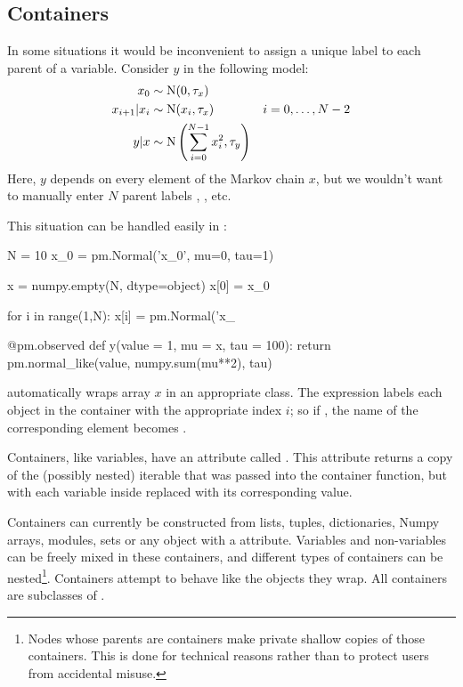 \documentclass[]{jss}
\begin{document}
\subsection{Containers} \label{container}

In some situations it would be inconvenient to assign a unique label to each parent of a variable. Consider $y$ in the following model:
\begin{align*}
    x_0 &\sim \textup N (0,\tau_x)\\
    x_{i+1}|x_i &\sim \textup{N}(x_i, \tau_x)
    &i=0,\ldots, N-2\\
    y|x &\sim \textup N \left(\sum_{i=0}^{N-1}x_i^2,\tau_y\right)
\end{align*}
Here, $y$ depends on every element of the Markov chain $x$, but we wouldn't want to manually enter $N$ parent labels , , etc.

This situation can be handled easily in :
\begin{CodeInput}
N = 10
x_0 = pm.Normal('x_0', mu=0, tau=1)

x = numpy.empty(N, dtype=object)
x[0] = x_0

for i in range(1,N):
	x[i] = pm.Normal('x_%

@pm.observed
def y(value = 1, mu = x, tau = 100):
	return pm.normal_like(value, numpy.sum(mu**2), tau)
\end{CodeInput}
 automatically wraps array $x$ in an appropriate  class. The  expression  labels each  object in the container with the appropriate index $i$; so if , the name of the corresponding element becomes .

Containers, like variables, have an attribute called . This attribute returns a copy of the (possibly nested) iterable that was passed into the container function, but with each variable inside replaced with its corresponding value.

Containers can currently be constructed from lists, tuples, dictionaries, Numpy arrays, modules, sets or any object with a  attribute. Variables and non-variables can be freely mixed in these containers, and different types of containers can be nested\footnote{Nodes whose parents are containers make private shallow copies of those containers. This is done for technical reasons rather than to protect users from accidental misuse.}. Containers attempt to behave like the objects they wrap. All containers are subclasses of .
\end{document}
